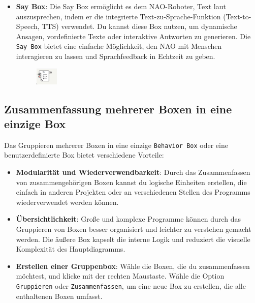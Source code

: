 \begin{itemize}
\begin{figure}[h]
        \label{fig:getFilePathBox}
    \end{figure}
    \item \textbf{Say Box}: Die Say Box ermöglicht es dem NAO-Roboter, Text laut auszusprechen, indem er die integrierte Text-zu-Sprache-Funktion (Text-to-Speech, TTS) verwendet. Du kannst diese Box nutzen, um dynamische Ansagen, vordefinierte Texte oder interaktive Antworten zu generieren. Die \texttt{Say Box} bietet eine einfache Möglichkeit, den NAO mit Menschen interagieren zu lassen und Sprachfeedback in Echtzeit zu geben.
    \begin{figure}[h]
        \centering
        \includegraphics[width=0.1\textwidth]{../images/sayBox.png}
        \label{fig:sayBox}
    \end{figure}
\end{itemize}
\subsection{Zusammenfassung mehrerer Boxen in eine einzige Box}
Das Gruppieren mehrerer Boxen in eine einzige \texttt{Behavior Box} oder eine benutzerdefinierte Box bietet verschiedene Vorteile:
\begin{itemize}
    \item \textbf{Modularität und Wiederverwendbarkeit}: Durch das Zusammenfassen von zusammengehörigen Boxen kannst du logische Einheiten erstellen, die einfach in anderen Projekten oder an verschiedenen Stellen des Programms wiederverwendet werden können.
    \item \textbf{Übersichtlichkeit}: Große und komplexe Programme können durch das Gruppieren von Boxen besser organisiert und leichter zu verstehen gemacht werden. Die äußere Box kapselt die interne Logik und reduziert die visuelle Komplexität des Hauptdiagramms.
    \item \textbf{Erstellen einer Gruppenbox}: Wähle die Boxen, die du zusammenfassen möchtest, und klicke mit der rechten Maustaste. Wähle die Option \texttt{Gruppieren} oder \texttt{Zusammenfassen}, um eine neue Box zu erstellen, die alle enthaltenen Boxen umfasst.
\end{itemize}

